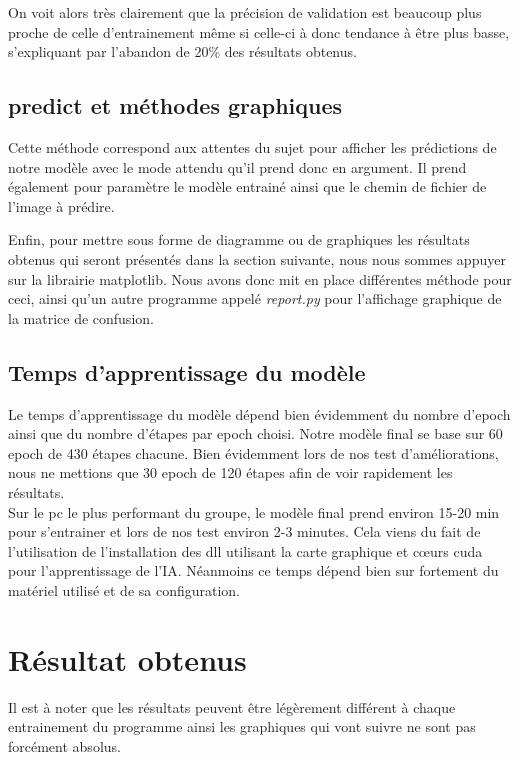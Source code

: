 \documentclass[12pt ,a4paper ]{article}
\begin{document}
\begin{multicols}{2}
On voit alors très clairement que la précision de validation est beaucoup plus proche de celle d'entrainement même si celle-ci à donc tendance à être plus basse, s'expliquant par l'abandon de 20\% des résultats obtenus. 

\subsection{predict et méthodes graphiques}
Cette méthode correspond aux attentes du sujet pour afficher les prédictions de notre modèle avec le mode attendu qu'il prend donc en argument. Il prend également pour paramètre le modèle entrainé ainsi que le chemin de fichier de l'image à prédire. 

Enfin, pour mettre sous forme de diagramme ou de graphiques les résultats obtenus qui seront présentés dans la section suivante, nous nous sommes appuyer sur la librairie matplotlib. Nous avons donc mit en place différentes méthode pour ceci, ainsi qu'un autre programme appelé \textit{report.py} pour l'affichage graphique de la matrice de confusion. 

\subsection{Temps d'apprentissage du modèle}
Le temps d'apprentissage du modèle dépend bien évidemment du nombre d'epoch ainsi que du nombre d'étapes par epoch choisi. Notre modèle final se base sur 60 epoch de 430 étapes chacune. Bien évidemment lors de nos test d'améliorations, nous ne mettions que 30 epoch de 120 étapes afin de voir rapidement les résultats. \\

Sur le pc le plus performant du groupe, le modèle final prend environ 15-20 min pour s'entrainer et lors de nos test environ 2-3 minutes. Cela viens du fait de l'utilisation de l'installation des dll utilisant la carte graphique et cœurs cuda pour l'apprentissage de l'IA. Néanmoins ce temps dépend bien sur fortement du matériel utilisé et de sa configuration.  


\newpage
\section{Résultat obtenus}
Il est à noter que les résultats peuvent être légèrement différent à chaque entrainement du programme ainsi les graphiques qui vont suivre ne sont pas forcément absolus. 


\end{multicols}
\end{document}
